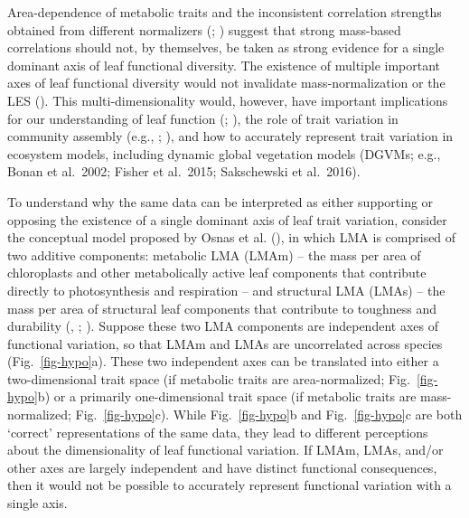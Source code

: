 \documentclass[
  12pt,
  letterpaper,
  DIV=11,
  numbers=noendperiod]{scrartcl}
\begin{document}
Area-dependence of metabolic traits and the inconsistent correlation
strengths obtained from different normalizers
(;
) suggest that strong
mass-based correlations should not, by themselves, be taken as strong
evidence for a single dominant axis of leaf functional diversity. The
existence of multiple important axes of leaf functional diversity would
not invalidate mass-normalization or the LES
(). This
multi-dimensionality would, however, have important implications for our
understanding of leaf function (; ), the role
of trait variation in community assembly (e.g.,
;
), and how to
accurately represent trait variation in ecosystem models, including
dynamic global vegetation models (DGVMs; e.g., Bonan et al.~2002; Fisher
et al.~2015; Sakschewski et al.~2016).

To understand why the same data can be interpreted as either supporting
or opposing the existence of a single dominant axis of leaf trait
variation, consider the conceptual model proposed by Osnas et al.
(), in which LMA is comprised of two
additive components: metabolic LMA (LMAm) -- the mass per area of
chloroplasts and other metabolically active leaf components that
contribute directly to photosynthesis and respiration -- and structural
LMA (LMAs) -- the mass per area of structural leaf components that
contribute to toughness and durability
(,
; ). Suppose these two LMA components are independent axes of
functional variation, so that LMAm and LMAs are uncorrelated across
species (Fig.~\ref{fig-hypo}a). These two independent axes can be
translated into either a two-dimensional trait space (if metabolic
traits are area-normalized; Fig.~\ref{fig-hypo}b) or a primarily
one-dimensional trait space (if metabolic traits are mass-normalized;
Fig.~\ref{fig-hypo}c). While Fig.~\ref{fig-hypo}b and
Fig.~\ref{fig-hypo}c are both `correct' representations of the same
data, they lead to different perceptions about the dimensionality of
leaf functional variation. If LMAm, LMAs, and/or other axes are largely
independent and have distinct functional consequences, then it would not
be possible to accurately represent functional variation with a single
axis.
\end{document}
